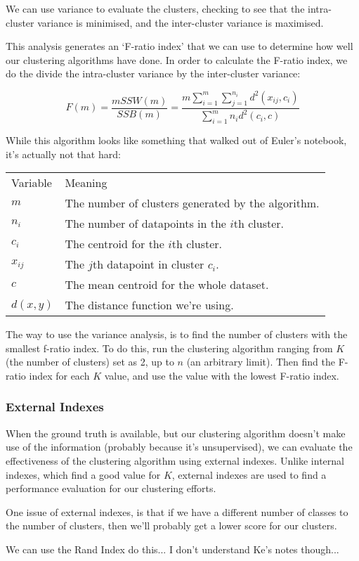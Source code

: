 We can use variance to evaluate the clusters, checking to see that the intra-
cluster variance is minimised, and the inter-cluster variance is maximised.

This analysis generates an `F-ratio index' that we can use to determine how well
our clustering algorithms have done. In order to calculate the F-ratio index, we
do the divide the intra-cluster variance by the inter-cluster variance:

\[
  F(m) = \frac{mSSW(m)}{SSB(m)} = \frac{m\sum\limits_{i=1}^m\sum\limits_{j=1}^{n_i}d^2(x_{ij},c_i)}{\sum\limits_{i=1}^mn_id^2(c_i,c)}
\]

While this algorithm looks like something that walked out of Euler's notebook,
it's actually not that hard:

\begin{center}
  \begin{tabular}{ll}
    Variable & Meaning\\
    $m$     & The number of clusters generated by the algorithm.\\
    $n_i$   & The number of datapoints in the $i$th cluster.\\
    $c_i$   & The centroid for the $i$th cluster.\\
    $x_{ij}$& The $j$th datapoint in cluster $c_i$.\\
    $c$     & The mean centroid for the whole dataset.\\
    $d(x,y)$& The distance function we're using.
  \end{tabular}
\end{center}

The way to use the variance analysis, is to find the number of clusters with the
smallest f-ratio index. To do this, run the clustering algorithm ranging from
$K$ (the number of clusters) set as 2, up to $n$ (an arbitrary limit). Then find
the F-ratio index for each $K$ value, and use the value with the lowest F-ratio
index.

\subsubsection{External Indexes}

When the ground truth is available, but our clustering algorithm doesn't make
use of the information (probably because it's unsupervised), we can evaluate the
effectiveness of the clustering algorithm using external indexes. Unlike internal
indexes, which find a good value for $K$, external indexes are used to find a
performance evaluation for our clustering efforts.


One issue of external indexes, is that if we have a different number of classes
to the number of clusters, then we'll probably get a lower score for our
clusters.


We can use the Rand Index do this... I don't understand Ke's notes though... 
